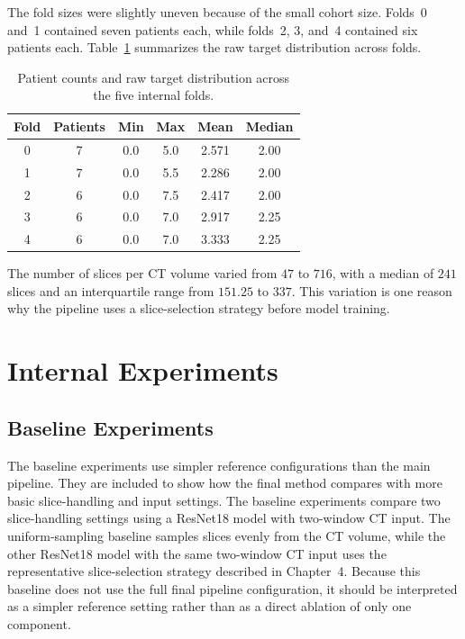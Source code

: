 The fold sizes were slightly uneven because of the small cohort size. Folds~0 and~1 contained seven patients each, while folds~2, 3, and~4 contained six patients each. Table~\ref{tab:dataset_fold_summary} summarizes the raw target distribution across folds.

\begin{table}[H]
\centering
\caption{Patient counts and raw target distribution across the five internal folds.}
\label{tab:dataset_fold_summary}
\small
\begin{tabular}{cccccc}
\toprule
Fold & Patients & Min & Max & Mean & Median \\
\midrule
0 & 7 & 0.0 & 5.0 & 2.571 & 2.00 \\
1 & 7 & 0.0 & 5.5 & 2.286 & 2.00 \\
2 & 6 & 0.0 & 7.5 & 2.417 & 2.00 \\
3 & 6 & 0.0 & 7.0 & 2.917 & 2.25 \\
4 & 6 & 0.0 & 7.0 & 3.333 & 2.25 \\
\bottomrule
\end{tabular}
\end{table}

The number of slices per CT volume varied from \(47\) to \(716\), with a median of \(241\) slices and an interquartile range from \(151.25\) to \(337\). This variation is one reason why the pipeline uses a slice-selection strategy before model training.


\section{Internal Experiments}
\label{sec:internal_experiments}


\subsection{Baseline Experiments}
\label{sec:baseline_experiments}
The baseline experiments use simpler reference configurations than the main pipeline. They are included to show how the final method compares with more basic slice-handling and input settings. The baseline experiments compare two slice-handling settings using a ResNet18 model with two-window CT input. The uniform-sampling baseline samples slices evenly from the CT volume, while the other ResNet18 model with the same two-window CT input uses the representative slice-selection strategy described in Chapter~4. Because this baseline does not use the full final pipeline configuration, it should be interpreted as a simpler reference setting rather than as a direct ablation of only one component.



